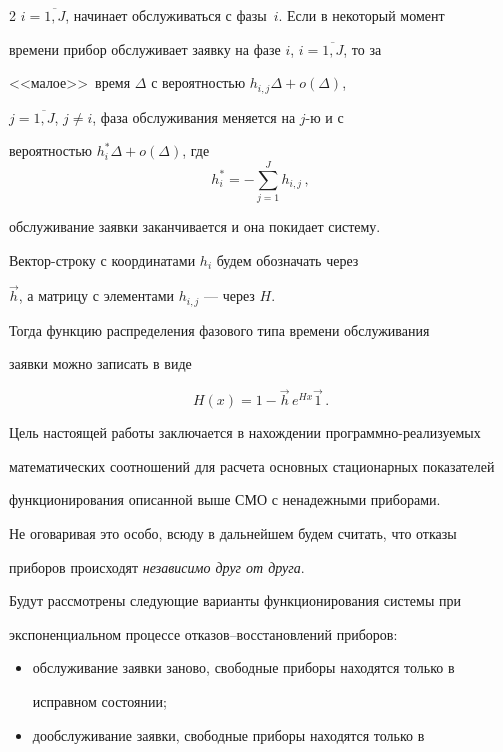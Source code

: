 \begin{multicols}{2}
$i=\overline{1,J}$, начинает обслуживаться с фазы~$i$. Если в некоторый момент 


времени прибор обслуживает заявку на фазе $i$, $i=\overline{1,J}$, то за 


<<малое>>\ время $\Delta$ с вероятностью $h_{i,j}\Delta+o(\Delta)$, 


$j=\overline{1,J}$, $j\ne i$, фаза обслуживания меняется на $j$-ю и с 


вероятностью $h_i^* \Delta+o(\Delta)$, где $$ h_i^*=- \sum\limits_{j=1}^J 


h_{i,j}\,,


$$


обслуживание заявки заканчивается и она покидает систему.


Вектор-строку с координатами $h_i$ будем обозначать через


$\vec h$, а матрицу с элементами $h_{i,j}$ --- через $H$.


Тогда функцию распределения фазового типа времени обслуживания


заявки можно записать в виде


$$


H(x) = 1-\vec h\, e^{Hx} \vec1\,.


$$








Цель настоящей работы заключается в на\-хож\-де\-нии программно-реализуемых


математических соотношений для расчета основных стационарных показателей


функционирования описанной выше СМО с ненадежными приборами.


Не оговаривая это особо, всюду в дальнейшем будем считать, что отказы


приборов происходят {\it независимо друг от друга}.





Будут рассмотрены следующие варианты функционирования системы при


экспоненциальном процессе отказов--восстановлений приборов:


\begin{itemize}


\item  обслуживание заявки заново, свободные приборы находятся только в


исправном состоянии;


\item дообслуживание заявки, свободные приборы находятся только в



\end{itemize}
\end{multicols}
